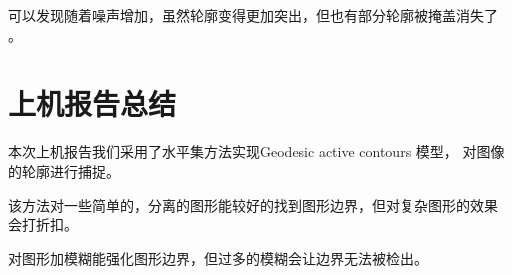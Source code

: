 \documentclass[a4paper,  11pt]{ctexart}
\begin{document}
\begin{figure}[H]
\end{figure}
可以发现随着噪声增加，虽然轮廓变得更加突出，但也有部分轮廓被掩盖消失了
。

\section{上机报告总结}
本次上机报告我们采用了水平集方法实现Geodesic active contours 模型，
对图像的轮廓进行捕捉。
\par
该方法对一些简单的，分离的图形能较好的找到图形边界，但对复杂图形的效果
会打折扣。

对图形加模糊能强化图形边界，但过多的模糊会让边界无法被检出。
\end{document}
